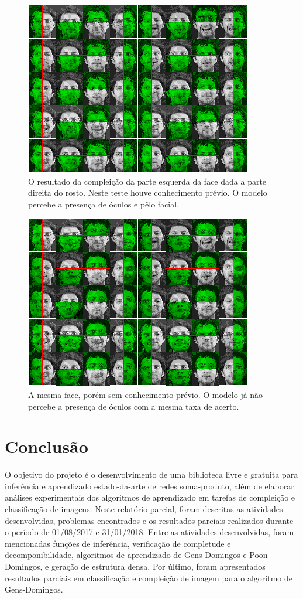 \documentclass[12pt]{article}
\theoremstyle{plain}
\numberwithin{equation}{section}
\begin{document}
\begin{figure}[h]
  \centering\includegraphics[scale=0.9]{imgs/c1_face_cmpl_39.png}
  \captionsetup{justification=raggedright}
  \caption{O resultado da compleição da parte esquerda da face dada a parte direita do rosto. Neste
  teste houve conhecimento prévio. O modelo percebe a presença de óculos e pêlo facial.}
\end{figure}
\newpage

\begin{figure}[H]
  \centering\includegraphics[scale=0.9]{imgs/c2_face_cmpl_39.png}
  \captionsetup{justification=raggedright}
  \caption{A mesma face, porém sem conhecimento prévio. O modelo já não percebe a presença de
  óculos com a mesma taxa de acerto.}
\end{figure}
\newpage

\section{Conclusão}

O objetivo do projeto é o desenvolvimento de uma biblioteca livre e gratuita para inferência e
aprendizado estado-da-arte de redes soma-produto, além de elaborar análises experimentais dos
algoritmos de aprendizado em tarefas de compleição e classificação de imagens. Neste relatório
parcial, foram descritas as atividades desenvolvidas, problemas encontrados e os resultados
parciais realizados durante o período de 01/08/2017 e 31/01/2018. Entre as atividades
desenvolvidas, foram mencionadas funções de inferência, verificação de completude e
decomponibilidade, algoritmos de aprendizado de Gens-Domingos e Poon-Domingos, e geração de
estrutura densa. Por último, foram apresentados resultados parciais em classificação e compleição
de imagem para o algoritmo de Gens-Domingos.

\printbibliography[]
\end{document}
